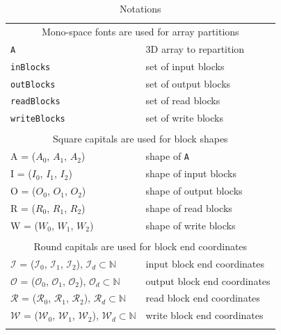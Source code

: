 \documentclass[sigconf, nonacm]{acmart}
\begin{document}
\begin{table}
  \caption{Notations}
  \begin{tabular}{ll}
    \multicolumn{2}{c}{\cellcolor{black!25}Mono-space fonts are used for array partitions}\\
    \texttt{A} & 3D array to repartition \\
    \texttt{inBlocks} & set of input blocks \\
    \texttt{outBlocks} & set of output blocks \\
    \texttt{readBlocks} & set of read blocks \\
    \texttt{writeBlocks} & set of write blocks \\

    &\\
    \multicolumn{2}{c}{\cellcolor{black!25}Square capitals are used for block shapes}\\
    A = ($A_0$, $A_1$, $A_2$) & shape of \texttt{A}\\
    I = ($I_0$, $I_1$, $I_2$)& shape of input blocks\\
    O = ($O_0$, $O_1$, $O_2$) & shape of output blocks\\
    R = ($R_0$, $R_1$, $R_2$) & shape of read blocks\\
    W = ($W_0$, $W_1$, $W_2$) & shape of write blocks\\
    &\\
    \multicolumn{2}{c}{\cellcolor{black!25}Round capitals are used for block end coordinates}\\

    $\mathcal{I}$ = ($\mathcal{I}_0$, $\mathcal{I}_1$, $\mathcal{I}_2$), \enskip $\mathcal{I}_d \subset \mathbb{N} $ & input block end coordinates \\
    $\mathcal{O}$ = ($\mathcal{O}_0$, $\mathcal{O}_1$, $\mathcal{O}_2$), \enskip $\mathcal{O}_d \subset \mathbb{N} $ & output block end coordinates\\
    $\mathcal{R}$ = ($\mathcal{R}_0$, $\mathcal{R}_1$, $\mathcal{R}_2$), \enskip $\mathcal{R}_d \subset \mathbb{N} $ & read block end coordinates\\
    $\mathcal{W}$ = ($\mathcal{W}_0$, $\mathcal{W}_1$, $\mathcal{W}_2$), \enskip $\mathcal{W}_d \subset \mathbb{N} $ & write block end coordinates\\
    &
  \end{tabular}
  \label{table:notations}
\end{table}
\end{document}
